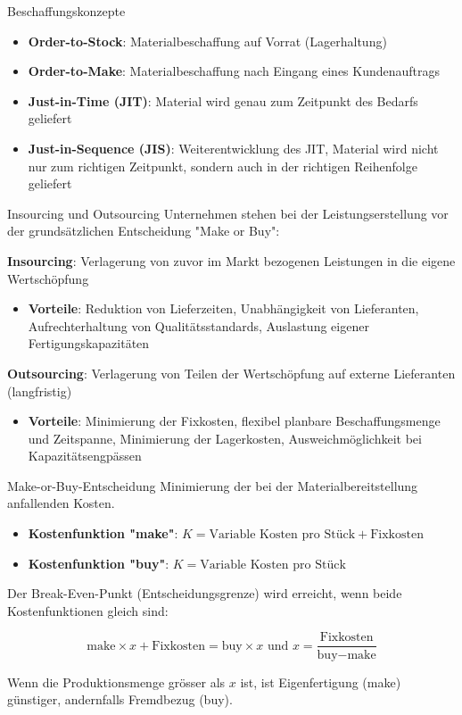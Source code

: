 \begin{definition}{Beschaffungskonzepte}
\begin{itemize}
    \item \textbf{Order-to-Stock}: Materialbeschaffung auf Vorrat (Lagerhaltung)
    \item \textbf{Order-to-Make}: Materialbeschaffung nach Eingang eines Kundenauftrags
    \item \textbf{Just-in-Time (JIT)}: Material wird genau zum Zeitpunkt des Bedarfs geliefert
    \item \textbf{Just-in-Sequence (JIS)}: Weiterentwicklung des JIT, Material wird nicht nur zum richtigen Zeitpunkt, sondern auch in der richtigen Reihenfolge geliefert
\end{itemize}
\end{definition}

\begin{definition}{Insourcing und Outsourcing}
Unternehmen stehen bei der Leistungserstellung vor der grundsätzlichen Entscheidung "Make or Buy":

\textbf{Insourcing}: Verlagerung von zuvor im Markt bezogenen Leistungen in die eigene Wertschöpfung
    \begin{itemize}
        \item \textbf{Vorteile}: Reduktion von Lieferzeiten, Unabhängigkeit von Lieferanten, Aufrechterhaltung von Qualitätsstandards, Auslastung eigener Fertigungskapazitäten
    \end{itemize}
\textbf{Outsourcing}: Verlagerung von Teilen der Wertschöpfung auf externe Lieferanten (langfristig)
    \begin{itemize}
        \item \textbf{Vorteile}: Minimierung der Fixkosten, flexibel planbare Beschaffungsmenge und Zeitspanne, Minimierung der Lagerkosten, Ausweichmöglichkeit bei Kapazitätsengpässen
    \end{itemize}
\end{definition}

\begin{concept}{Make-or-Buy-Entscheidung} Minimierung der bei der Materialbereitstellung anfallenden Kosten.
\begin{itemize}
    \item \textbf{Kostenfunktion "make"}: $K = \text{Variable Kosten pro Stück} + \text{Fixkosten}$
    \item \textbf{Kostenfunktion "buy"}: $K = \text{Variable Kosten pro Stück}$
\end{itemize}

Der Break-Even-Punkt (Entscheidungsgrenze) wird erreicht, wenn beide Kostenfunktionen gleich sind:

$$\text{make} \times x + \text{Fixkosten} = \text{buy} \times x \text{ und } x = \frac{\text{Fixkosten}}{\text{buy} - \text{make}}$$

Wenn die Produktionsmenge grösser als $x$ ist, ist Eigenfertigung (make) günstiger, andernfalls Fremdbezug (buy).
\end{concept}

